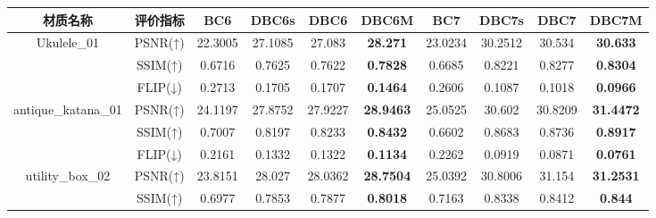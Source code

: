 \begin{table*}[htbp]
{    %
\begin{tabular}{cccccccccc}
    \toprule
    材质名称   & 评价指标 & BC6 & DBC6s & DBC6 & DBC6M & BC7 & DBC7s & DBC7 & DBC7M \\
    \midrule
    \multirow{3}{*}{Ukulele\_01}         &PSNR(↑) & 22.3005 & 27.1085 & 27.083 & \textbf{28.271} & 23.0234 & 30.2512 & 30.534 & \textbf{30.633} \\
                                         &SSIM(↑) & 0.6716 & 0.7625 & 0.7622 & \textbf{0.7828} & 0.6685 & 0.8221 & 0.8277 & \textbf{0.8304} \\
                                         &FLIP(↓) & 0.2713 & 0.1705 & 0.1707 & \textbf{0.1464} & 0.2606 & 0.1087 & 0.1018 & \textbf{0.0966} \\
    \midrule
    \multirow{3}{*}{antique\_katana\_01} &PSNR(↑) & 24.1197 & 27.8752 & 27.9227 & \textbf{28.9463} & 25.0525 & 30.602 & 30.8209 & \textbf{31.4472} \\
                                         &SSIM(↑) & 0.7007 & 0.8197 & 0.8233 & \textbf{0.8432} & 0.6602 & 0.8683 & 0.8736 & \textbf{0.8917} \\
                                         &FLIP(↓) & 0.2161 & 0.1332 & 0.1322 & \textbf{0.1134} & 0.2262 & 0.0919 & 0.0871 & \textbf{0.0761} \\
    \midrule
    \multirow{3}{*}{utility\_box\_02}    &PSNR(↑) & 23.8151 & 28.027 & 28.0362 & \textbf{28.7504} & 25.0392 & 30.8006 & 31.154 & \textbf{31.2531} \\
                                         &SSIM(↑) & 0.6977 & 0.7853 & 0.7877 & \textbf{0.8018} & 0.7163 & 0.8338 & 0.8412 & \textbf{0.844} \\

\end{tabular}}
\end{table*}
